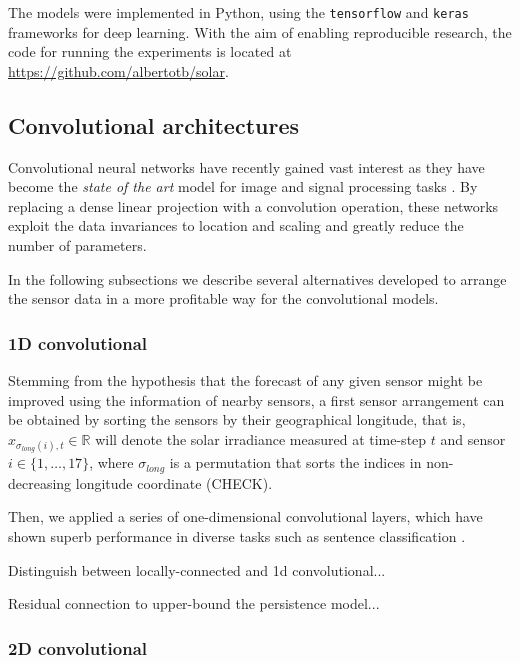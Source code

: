 \documentclass[preprints,article,accept,moreauthors,pdftex]{template/mdpi}
\begin{document}
The models were implemented in Python, using the \texttt{tensorflow} \cite{abadi2016tensorflow} and \texttt{keras} \cite{chollet2015keras} frameworks for deep learning. With the aim of enabling reproducible research, the code for running the experiments is located at \url{https://github.com/albertotb/solar}.

\subsection{Convolutional architectures}

Convolutional neural networks \cite{krizhevsky2012imagenet} have recently gained vast interest as they have become the \emph{state of the art} model for image and signal processing tasks \cite{ji20123d, karpathy2014large, abdel2014convolutional}. By replacing a dense linear projection with a convolution operation, these networks exploit the data invariances to location and scaling and greatly reduce the number of parameters.

In the following subsections we describe several alternatives developed to arrange the sensor data in a more profitable way for the convolutional models.

\subsubsection{1D convolutional}

Stemming from the hypothesis that the forecast of any given sensor might be improved using the information of nearby sensors, a first sensor arrangement can be obtained by sorting the sensors by their geographical longitude, that is, $ x_{\sigma_{long}(i),t} \in \mathbb{R}$ will denote the solar irradiance measured at time-step $t$ and sensor $i \in \lbrace 1, \ldots, 17 \rbrace$, where $\sigma_{long}$ is a permutation that sorts the indices in non-decreasing longitude coordinate (CHECK).

Then, we applied a series of one-dimensional convolutional layers, which have shown superb performance in diverse tasks such as sentence classification \cite{kim2014convolutional}.

Distinguish between locally-connected and 1d convolutional...

Residual connection to upper-bound the persistence model...

\subsubsection{2D convolutional}
\end{document}
